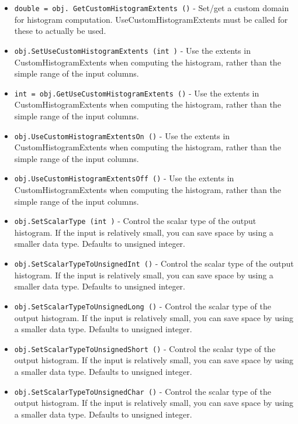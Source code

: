 \begin{itemize}
\item  \verb|double = obj. GetCustomHistogramExtents ()| -  Set/get a custom domain for histogram computation.  UseCustomHistogramExtents
 must be called for these to actually be used.

\item  \verb|obj.SetUseCustomHistogramExtents (int )| -  Use the extents in CustomHistogramExtents when computing the
 histogram, rather than the simple range of the input columns.

\item  \verb|int = obj.GetUseCustomHistogramExtents ()| -  Use the extents in CustomHistogramExtents when computing the
 histogram, rather than the simple range of the input columns.

\item  \verb|obj.UseCustomHistogramExtentsOn ()| -  Use the extents in CustomHistogramExtents when computing the
 histogram, rather than the simple range of the input columns.

\item  \verb|obj.UseCustomHistogramExtentsOff ()| -  Use the extents in CustomHistogramExtents when computing the
 histogram, rather than the simple range of the input columns.

\item  \verb|obj.SetScalarType (int )| -  Control the scalar type of the output histogram.  If the input
 is relatively small, you can save space by using a smaller
 data type.  Defaults to unsigned integer.

\item  \verb|obj.SetScalarTypeToUnsignedInt ()| -  Control the scalar type of the output histogram.  If the input
 is relatively small, you can save space by using a smaller
 data type.  Defaults to unsigned integer.

\item  \verb|obj.SetScalarTypeToUnsignedLong ()| -  Control the scalar type of the output histogram.  If the input
 is relatively small, you can save space by using a smaller
 data type.  Defaults to unsigned integer.

\item  \verb|obj.SetScalarTypeToUnsignedShort ()| -  Control the scalar type of the output histogram.  If the input
 is relatively small, you can save space by using a smaller
 data type.  Defaults to unsigned integer.

\item  \verb|obj.SetScalarTypeToUnsignedChar ()| -  Control the scalar type of the output histogram.  If the input
 is relatively small, you can save space by using a smaller
 data type.  Defaults to unsigned integer.


\end{itemize}
